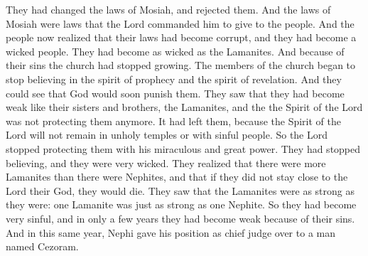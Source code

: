 They had changed the laws of Mosiah, and rejected them. And the laws of Mosiah were laws that the Lord commanded him to give to the people. And the people now realized that their laws had become corrupt, and they had become a wicked people. They had become as wicked as the Lamanites.
\bverse \iffalse And because of their iniquity the church had begun to dwindle; and they began to disbelieve in the spirit of prophecy and in the spirit of revelation; and the judgments of God did stare them in the face. \fi
And because of their sins the church had stopped growing. The members of the church began to stop believing in the spirit of prophecy and the spirit of revelation. And they could see that God would soon punish them.
\bverse \iffalse And they saw that they had become weak, like unto their brethren, the Lamanites, and that the Spirit of the Lord did no more preserve them; yea, it had withdrawn from them because the Spirit of the Lord doth not dwell in unholy temples-- \fi
They saw that they had become weak like their sisters and brothers, the Lamanites, and the the Spirit of the Lord was not protecting them anymore. It had left them, because the Spirit of the Lord will not remain in unholy temples or with sinful people.
\bverse \iffalse Therefore the Lord did cease to preserve them by his miraculous and matchless power, for they had fallen into a state of unbelief and awful wickedness; and they saw that the Lamanites were exceedingly more numerous than they, and except they should cleave unto the Lord their God, they must unavoidably perish. \fi
So the Lord stopped protecting them with his miraculous and great power. They had stopped believing, and they were very wicked. They realized that there were more Lamanites than there were Nephites, and that if they did not stay close to the Lord their God, they would die.
\bverse \iffalse For behold, they saw that the strength of the Lamanites was as great as their strength, even man for man. And thus had they fallen into this great transgression; yea, thus had they become weak, because of their transgression, in the space of not many years. \fi
They saw that the Lamanites were as strong as they were: one Lamanite was just as strong as one Nephite. So they had become very sinful, and in only a few years they had become weak because of their sins.
\bchapter
\bverse \iffalse And it came to pass that in this same year, behold, Nephi delivered up the judgment-seat to a man whose name was Cezoram. \fi
And in this same year, Nephi gave his position as chief judge over to a man named Cezoram.
